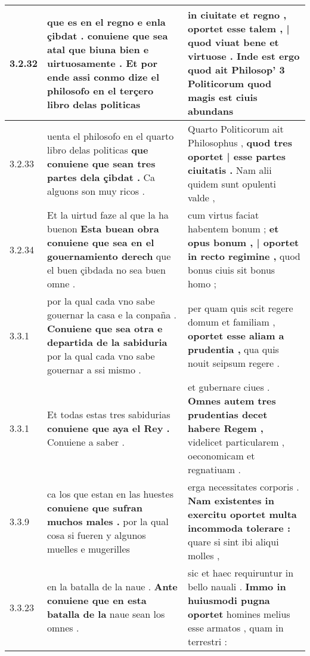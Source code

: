 \begin{tabular}{|p{1cm}|p{6.5cm}|p{6.5cm}|}
3.2.32 & que es en el regno e enla çibdat . \textbf{ conuiene que sea atal que biuna bien e uirtuosamente . } Et por ende assi conmo dize el philosofo en el terçero libro delas politicas & in ciuitate et regno , \textbf{ oportet esse talem , | quod viuat bene et virtuose . } Inde est ergo quod ait Philosop’ 3 Politicorum quod magis est ciuis abundans \\\hline
3.2.33 & uenta el philosofo en el quarto libro delas politicas \textbf{ que conuiene que sean tres partes dela çibdat . } Ca alguons son muy ricos . & Quarto Politicorum ait Philosophus , \textbf{ quod tres oportet | esse partes ciuitatis . } Nam alii quidem sunt opulenti valde , \\\hline
3.2.34 & Et la uirtud faze al que la ha buenon \textbf{ Esta buean obra conuiene que sea en el gouernamiento derech } que el buen çibdada no sea buen omne . & cum virtus faciat habentem bonum ; \textbf{ et opus bonum , | oportet in recto regimine , } quod bonus ciuis sit bonus homo ; \\\hline
3.3.1 & por la qual cada vno sabe gouernar la casa e la conpaña . \textbf{ Conuiene que sea otra e departida de la sabiduria } por la qual cada vno sabe gouernar a ssi mismo . & per quam quis scit regere domum et familiam , \textbf{ oportet esse aliam a prudentia , } qua quis nouit seipsum regere . \\\hline
3.3.1 & Et todas estas tres sabidurias \textbf{ conuiene que aya el Rey . } Conuiene a saber . & et gubernare ciues . \textbf{ Omnes autem tres prudentias decet habere Regem , } videlicet particularem , oeconomicam et regnatiuam . \\\hline
3.3.9 & ca los que estan en las huestes \textbf{ conuiene que sufran muchos males . } por la qual cosa si fueren y algunos muelles e mugerilles & erga necessitates corporis . \textbf{ Nam existentes in exercitu oportet multa incommoda tolerare : } quare si sint ibi aliqui molles , \\\hline
3.3.23 & en la batalla de la naue . \textbf{ Ante conuiene que en esta batalla de la } naue sean los omnes . & sic et haec requiruntur in bello nauali . \textbf{ Immo in huiusmodi pugna oportet } homines melius esse armatos , quam in terrestri : \\\hline

\end{tabular}
